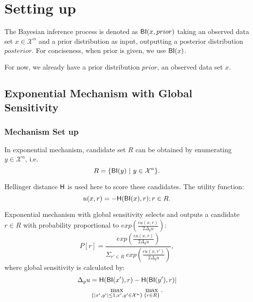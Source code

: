 \documentclass{article}
\begin{document}
\printAffiliationsAndNotice{\icmlEqualContribution} %

\begin{abstract}
\end{abstract}

\section{Setting up}
\label{sec_setup}
The Bayesian inference process is denoted as $\mathsf{BI}(x,prior)$ taking an observed data set $x \in \mathcal{X}^n$ and a prior distribution as input, outputting a posterior distribution $posterior$. For conciseness, when prior is given, we use $\mathsf{BI}(x)$.

For now, we already have a prior distribution $prior$, an observed data set $x$.

\subsection{Exponential Mechanism with Global Sensitivity}
\label{subsec_emgs}

\subsubsection{Mechanism Set up}
In exponential mechanism, candidate set $R$ can be obtained by enumerating $y \in \mathcal{X}^n$, i.e.
\begin{equation*}
R = \{\mathsf{BI}(y)\ |\ y \in \mathcal{X}^n\}.
\end{equation*}

Hellinger distance $\mathsf{H}$ is used here to score these candidates. The utility function:
\begin{equation}
\label{equ_utility}
u(x,r) = -\mathsf{H}(\mathsf{BI}(x), r); r \in R.
\end{equation}

Exponential mechanism with global sensitivity selects and outputs a candidate $r \in R$ with probability proportional to $exp(\frac{\epsilon u(x,r)}{2 \Delta_{g}u})$:
\begin{equation*}
P[r] = \frac
{exp(\frac{\epsilon u(x,r)}{2 \Delta_{g}u})}
{\Sigma_{r' \in R}\ exp(\frac{\epsilon u(x,r')}{2 \Delta_{g}u})},
\end{equation*}
where global sensitivity is calculated by:
\begin{multline*}
\Delta_{g}u = 
\mathsf{H}(\mathsf{BI}(x'), r) - \mathsf{H}(\mathsf{BI}(y'), r)|\\
\max_{\{|x',y'| \leq 1;x',y'\in \mathcal{X}^n\}}\max_{\{r\in R\}}.
\end{multline*}
\end{document}
